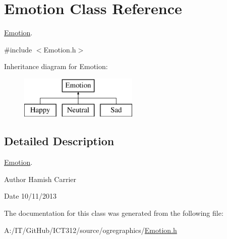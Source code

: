 \hypertarget{class_emotion}{\section{Emotion Class Reference}
\label{class_emotion}
}


\hyperlink{class_emotion}{Emotion}.  




{\ttfamily \#include $<$Emotion.\-h$>$}

Inheritance diagram for Emotion\-:\begin{figure}[H]
\begin{center}
\leavevmode
\includegraphics[height=2.000000cm]{class_emotion}
\end{center}
\end{figure}


\subsection{Detailed Description}
\hyperlink{class_emotion}{Emotion}. 

\begin{DoxyAuthor}{Author}
Hamish Carrier 
\end{DoxyAuthor}
\begin{DoxyDate}{Date}
10/11/2013 
\end{DoxyDate}


The documentation for this class was generated from the following file\-:\begin{DoxyCompactItemize}
\item 
A\-:/\-I\-T/\-Git\-Hub/\-I\-C\-T312/source/ogregraphics/\hyperlink{_emotion_8h}{Emotion.\-h}\end{DoxyCompactItemize}
